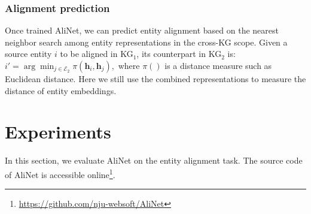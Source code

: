 \documentclass[letterpaper]{article} \usepackage{aaai20}  \usepackage{times}  \usepackage{helvet} \usepackage{courier}  \usepackage[hyphens]{url}  \usepackage{graphicx} \urlstyle{rm} \def\UrlFont{\rm}  \frenchspacing  \setlength{\pdfpagewidth}{8.5in}  \setlength{\pdfpageheight}{11in}  \usepackage{amsmath}
\begin{document}
\subsubsection{Alignment prediction} Once trained AliNet, we can predict entity alignment based on the nearest neighbor search among entity representations in the cross-KG scope. Given a source entity $i$ to be aligned in KG$_1$, its counterpart in KG$_2$ is: $i'=\arg \min_{j \in \mathcal{E}_2} \pi (\mathbf{h}_i, \mathbf{h}_{j}),$
where $\pi()$ is a distance measure such as Euclidean distance. Here we still use the combined representations to measure the distance of entity embeddings.

\section{Experiments}
In this section, we evaluate AliNet on the entity alignment task. The source code of AliNet is accessible online\footnote{\url{https://github.com/nju-websoft/AliNet}}.
\end{document}
